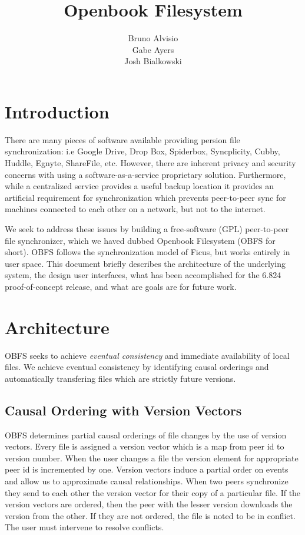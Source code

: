 \documentclass[10pt,twocolumn]{article}
\title{Openbook Filesystem}
\author{Bruno Alvisio\\Gabe Ayers\\Josh Bialkowski}
\begin{document}
\maketitle
\section{Introduction}

There are many pieces of software available providing persion file 
synchronization: i.e Google Drive, Drop Box, Spiderbox, Syncplicity, Cubby,
Huddle, Egnyte, ShareFile, etc. However, there are inherent privacy and 
security concerns with using a software-as-a-service proprietary solution. 
Furthermore, while a centralized service provides a useful backup location it
provides an artificial requirement for synchronization which prevents 
peer-to-peer sync for machines connected to each other on a network, but not
to the internet.

We seek to address these issues by building a free-software (GPL) peer-to-peer
file synchronizer, which we haved dubbed Openbook Filesystem (OBFS for short). OBFS
follows the synchronization model of Ficus, but works entirely in user space. 
This document briefly describes the architecture of the underlying system, 
the design user interfaces, what has been accomplished for the 6.824 
proof-of-concept release, and what are goals are for future work.  

\section{Architecture}

OBFS seeks to achieve \emph{eventual consistency} and immediate availability 
of local files. We achieve eventual consistency by identifying causal orderings
and automatically transfering files which are strictly future versions. 

\subsection{Causal Ordering with Version Vectors}
OBFS determines partial causal orderings of file changes by the use of version
vectors. Every file is assigned a version vector which is a map from peer id to
version number. When the user changes a file the version element for appropriate
peer id is incremented by one. Version vectors induce a partial order on events
and allow us to approximate causal relationships. When two peers synchronize
they send to each other the version vector for their copy of a particular file.
If the version vectors are ordered, then the peer with the lesser version
downloads the version from the other. If they are not ordered, the file is noted
to be in conflict. The user must intervene to resolve conflicts.
\end{document}
